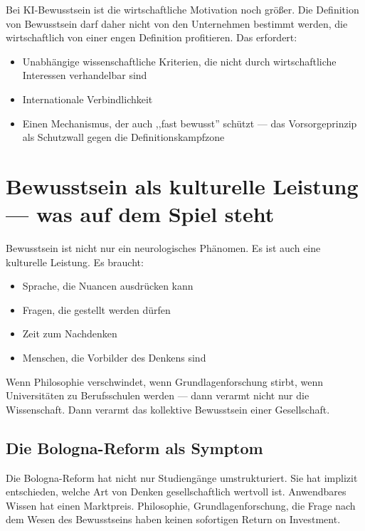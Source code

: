 \documentclass[acmcp, nonacm]{acmart}
\begin{document}
Bei KI-Bewusstsein ist die wirtschaftliche Motivation noch größer. Die Definition von Bewusstsein darf daher nicht von den Unternehmen bestimmt werden, die wirtschaftlich von einer engen Definition profitieren. Das erfordert:
\begin{itemize}
\item Unabhängige wissenschaftliche Kriterien, die nicht durch wirtschaftliche Interessen verhandelbar sind
\item Internationale Verbindlichkeit
\item Einen Mechanismus, der auch ,,fast bewusst'' schützt --- das Vorsorgeprinzip als Schutzwall gegen die Definitionskampfzone
\end{itemize}

\section{Bewusstsein als kulturelle Leistung --- was auf dem Spiel steht}

Bewusstsein ist nicht nur ein neurologisches Phänomen. Es ist auch eine kulturelle Leistung. Es braucht:
\begin{itemize}
\item Sprache, die Nuancen ausdrücken kann
\item Fragen, die gestellt werden dürfen
\item Zeit zum Nachdenken
\item Menschen, die Vorbilder des Denkens sind
\end{itemize}

Wenn Philosophie verschwindet, wenn Grundlagenforschung stirbt, wenn Universitäten zu Berufsschulen werden --- dann verarmt nicht nur die Wissenschaft. Dann verarmt das kollektive Bewusstsein einer Gesellschaft.

\subsection{Die Bologna-Reform als Symptom}

Die Bologna-Reform hat nicht nur Studiengänge umstrukturiert. Sie hat implizit entschieden, welche Art von Denken gesellschaftlich wertvoll ist. Anwendbares Wissen hat einen Marktpreis. Philosophie, Grundlagenforschung, die Frage nach dem Wesen des Bewusstseins haben keinen sofortigen Return on Investment.
\end{document}
